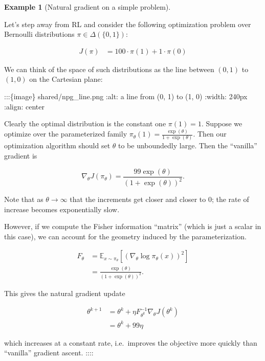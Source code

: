 \documentclass[
  letterpaper,
  DIV=11,
  numbers=noendperiod]{scrreprt}
\theoremstyle{plain}
\theoremstyle{plain}
\theoremstyle{definition}
\newtheorem{example}{Example}[chapter]
\theoremstyle{definition}
\theoremstyle{remark}
\begin{document}
\begin{example}[Natural gradient on a simple
problem]\protect\hypertarget{exm-natural_simple}{}\label{exm-natural_simple}

Let's step away from RL and consider the following optimization problem
over Bernoulli distributions \(\pi \in \Delta(\{ 0, 1 \})\):

\[
\begin{aligned}
        J(\pi) & = 100 \cdot \pi(1) + 1 \cdot \pi(0)
\end{aligned}
\]

We can think of the space of such distributions as the line between
\((0, 1)\) to \((1, 0)\) on the Cartesian plane:

:::\{image\} shared/npg\_line.png :alt: a line from (0, 1) to (1, 0)
:width: 240px :align: center

\end{example}

Clearly the optimal distribution is the constant one \(\pi(1) = 1\).
Suppose we optimize over the parameterized family
\(\pi_\theta(1) = \frac{\exp(\theta)}{1+\exp(\theta)}\). Then our
optimization algorithm should set \(\theta\) to be unboundedly large.
Then the ``vanilla'' gradient is

\[\nabla_\theta J(\pi_\theta) = \frac{99 \exp(\theta)}{(1 + \exp(\theta))^2}.\]

Note that as \(\theta \to \infty\) that the increments get closer and
closer to \(0\); the rate of increase becomes exponentially slow.

However, if we compute the Fisher information ``matrix'' (which is just
a scalar in this case), we can account for the geometry induced by the
parameterization.

\[
\begin{aligned}
        F_\theta & = \mathbb{E}_{x \sim \pi_\theta} [ (\nabla_\theta \log \pi_\theta(x))^2 ] \\
                 & = \frac{\exp(\theta)}{(1 + \exp(\theta))^2}.
\end{aligned}
\]

This gives the natural gradient update

\[
\begin{aligned}
        \theta^{k+1} & = \theta^k + \eta F_{\theta^k}^{-1} \nabla_ \theta J(\theta^k) \\
                     & = \theta^k + 99 \eta
\end{aligned}
\]

which increases at a constant rate, i.e.~improves the objective more
quickly than ``vanilla'' gradient ascent. ::::
\end{document}
